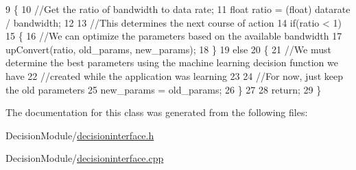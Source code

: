 \begin{DoxyCode}
9 \{
10     \textcolor{comment}{//Get the ratio of bandwidth to data rate;}
11     \textcolor{keywordtype}{float} ratio = (float) datarate / bandwidth;
12 
13     \textcolor{comment}{//This determines the next course of action}
14     \textcolor{keywordflow}{if}(ratio < 1)
15     \{
16         \textcolor{comment}{//We can optimize the parameters based on the available bandwidth}
17         upConvert(ratio, old\_params, new\_params);
18     \}
19     \textcolor{keywordflow}{else}
20     \{
21         \textcolor{comment}{//We must determine the best parameters using the machine learning decision function we have}
22         \textcolor{comment}{//created while the application was learning}
23 
24         \textcolor{comment}{//For now, just keep the old parameters}
25         new\_params = old\_params;
26     \}
27 
28     \textcolor{keywordflow}{return};
29 \}
\end{DoxyCode}


The documentation for this class was generated from the following files\-:\begin{DoxyCompactItemize}
\item 
Decision\-Module/\hyperlink{decisioninterface_8h}{decisioninterface.\-h}\item 
Decision\-Module/\hyperlink{decisioninterface_8cpp}{decisioninterface.\-cpp}\end{DoxyCompactItemize}
